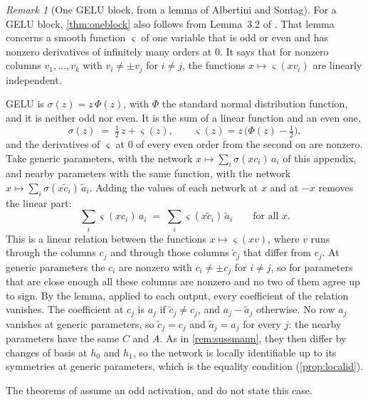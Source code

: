 \documentclass[10pt]{article}
\theoremstyle{definition}
\theoremstyle{remark}
\newtheorem{remark}[theorem]{Remark}
\begin{document}
\begin{remark}[One GELU block, from a lemma of Albertini and Sontag]\label{rem:gelu}
For a GELU block, \cref{thm:oneblock} also follows from Lemma~3.2 of \citet{albertini1993discrete}. That lemma concerns a smooth function $\varsigma$ of one variable that is odd or even and has nonzero derivatives of infinitely many orders at $0$. It says that for nonzero columns $v_1, \dots, v_k$ with $v_i \neq \pm v_j$ for $i \neq j$, the functions $x \mapsto \varsigma(xv_i)$ are linearly independent.

GELU is $\sigma(z) = z\,\Phi(z)$, with $\Phi$ the standard normal distribution function, and it is neither odd nor even. It is the sum of a linear function and an even one,
\[
\sigma(z) \;=\; \tfrac12\,z + \varsigma(z), \qquad \varsigma(z) = z\,\big(\Phi(z) - \tfrac12\big),
\]
and the derivatives of $\varsigma$ at $0$ of every even order from the second on are nonzero. Take generic parameters, with the network $x \mapsto \sum_i \sigma(xc_i)\,a_i$ of this appendix, and nearby parameters with the same function, with the network $x \mapsto \sum_i \sigma(x\tilde c_i)\,\tilde a_i$. Adding the values of each network at $x$ and at $-x$ removes the linear part:
\[
\sum_i \varsigma(xc_i)\,a_i \;=\; \sum_i \varsigma(x\tilde c_i)\,\tilde a_i \qquad\text{for all } x .
\]
This is a linear relation between the functions $x \mapsto \varsigma(xv)$, where $v$ runs through the columns $c_j$ and through those columns $\tilde c_j$ that differ from $c_j$. At generic parameters the $c_i$ are nonzero with $c_i \neq \pm c_j$ for $i \neq j$, so for parameters that are close enough all these columns are nonzero and no two of them agree up to sign. By the lemma, applied to each output, every coefficient of the relation vanishes. The coefficient at $c_j$ is $a_j$ if $\tilde c_j \neq c_j$, and $a_j - \tilde a_j$ otherwise. No row $a_j$ vanishes at generic parameters, so $\tilde c_j = c_j$ and $\tilde a_j = a_j$ for every $j$: the nearby parameters have the same $C$ and $A$. As in \cref{rem:sussmann}, they then differ by changes of basis at $h_0$ and $h_1$, so the network is locally identifiable up to its symmetries at generic parameters, which is the equality condition (\cref{prop:localid}).

The theorems of \citet{albertini1993discrete} assume an odd activation, and do not state this case.
\end{remark}
\end{document}
